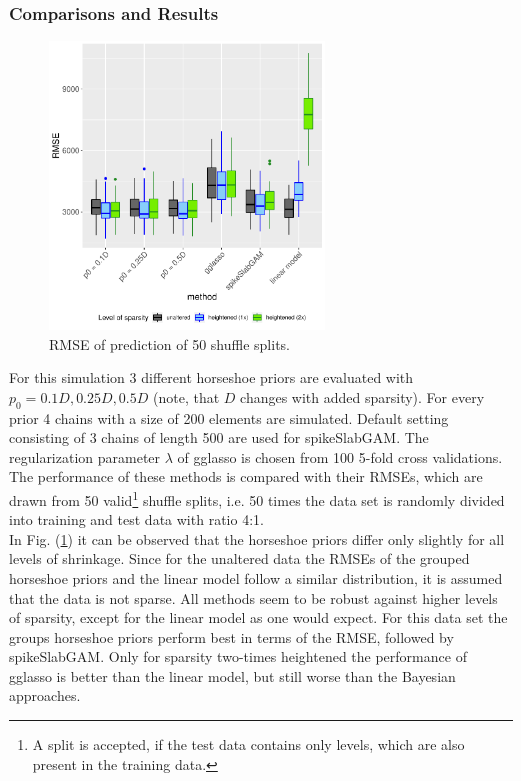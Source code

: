 \documentclass[12pt,letterpaper]{article}
\numberwithin{equation}{subsection}
\begin{document}
\subsubsection{Comparisons and Results}
\label{sec:amcs}
\begin{figure}[hbt!]
 \centering
 \includegraphics[width=0.65\textwidth]{../plots/am-mse.pdf}
 \caption[RMSE of prediction (automobile)]{RMSE of prediction of 50 shuffle splits.}
 \label{fig:am-mse}
\end{figure}
For this simulation 3 different horseshoe priors are evaluated with $p_0 = 0.1D, 0.25D, 0.5D$ (note, that $D$ changes with added sparsity).  For every prior 4 chains with a size of 200 elements are simulated. Default setting consisting of 3 chains of length 500 are used for spikeSlabGAM. The regularization parameter $\lambda$ of gglasso is chosen from 100 5-fold cross validations.
The performance of these methods is compared with their RMSEs, which are drawn from 50 valid\footnote{A split is accepted, if the test data contains only  levels, which are also present in the training data.}  shuffle splits, i.e. 50 times the data set is randomly divided into training and test data with ratio 4:1. \\
In Fig. (\ref{fig:am-mse}) it can be observed that the horseshoe priors differ only slightly for all levels of shrinkage.
Since for the unaltered data the RMSEs of the grouped horseshoe priors and the linear model follow a similar distribution, it is assumed that the data is not sparse. All methods seem to be robust against higher levels of sparsity, except for the linear model as one would expect. For this data set the groups horseshoe priors perform best in terms of the RMSE, followed by spikeSlabGAM. Only for sparsity two-times heightened the performance of gglasso is better than the linear model, but still worse than the Bayesian approaches.
\FloatBarrier
\end{document}
